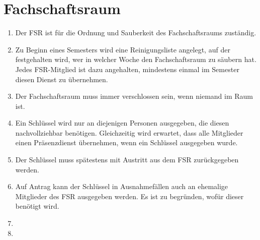 \section{Fachschaftsraum}
\begin{enumerate}
	\item Der FSR ist für die Ordnung und Sauberkeit des Fachschaftsraums zuständig.
	\item Zu Beginn eines Semesters wird eine Reinigungsliste angelegt, auf der festgehalten wird, wer in welcher Woche den Fachschaftsraum zu säubern hat.
	Jedes FSR-Mitglied ist dazu angehalten, mindestens einmal im Semester diesen Dienst zu übernehmen.
	\item Der Fachschaftsraum muss immer verschlossen sein, wenn niemand im Raum ist.
	\item Ein Schlüssel wird nur an diejenigen Personen ausgegeben, die diesen nachvollziehbar benötigen.
	Gleichzeitig wird erwartet, dass alle Mitglieder einen Präsenzdienst übernehmen, wenn ein Schlüssel ausgegeben wurde.
	\item Der Schlüssel muss spätestens mit Austritt aus dem FSR zurückgegeben werden.
	\item Auf Antrag kann der Schlüssel in Ausnahmefällen auch an ehemalige Mitglieder des FSR ausgegeben werden.
	Es ist zu begründen, wofür  dieser benötigt wird.
	\item {}
	\item {}
\end{enumerate}

